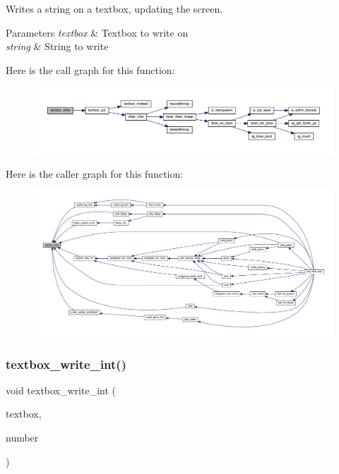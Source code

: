 Writes a string on a textbox, updating the screen. 


\begin{DoxyParams}{Parameters}
{\em textbox} & Textbox to write on \\
\hline
{\em string} & String to write \\
\hline
\end{DoxyParams}
Here is the call graph for this function\+:\nopagebreak
\begin{figure}[H]
\begin{center}
\leavevmode
\includegraphics[width=350pt]{group__textbox_ga71eed99ce4466e9e7b3ad1b9d61f2312_cgraph}
\end{center}
\end{figure}
Here is the caller graph for this function\+:\nopagebreak
\begin{figure}[H]
\begin{center}
\leavevmode
\includegraphics[width=350pt]{group__textbox_ga71eed99ce4466e9e7b3ad1b9d61f2312_icgraph}
\end{center}
\end{figure}
\mbox{\label{group__textbox_ga6a60cec4ef24e6e154b93aa81af2b988}} 
\subsubsection{\texorpdfstring{textbox\+\_\+write\+\_\+int()}{textbox\_write\_int()}}
{\footnotesize\ttfamily void textbox\+\_\+write\+\_\+int (\begin{DoxyParamCaption}\item[{\mbox{\hyperlink{struct_text_box}{Text\+Box}} $\ast$}]{textbox,  }\item[{int}]{number }\end{DoxyParamCaption})}



